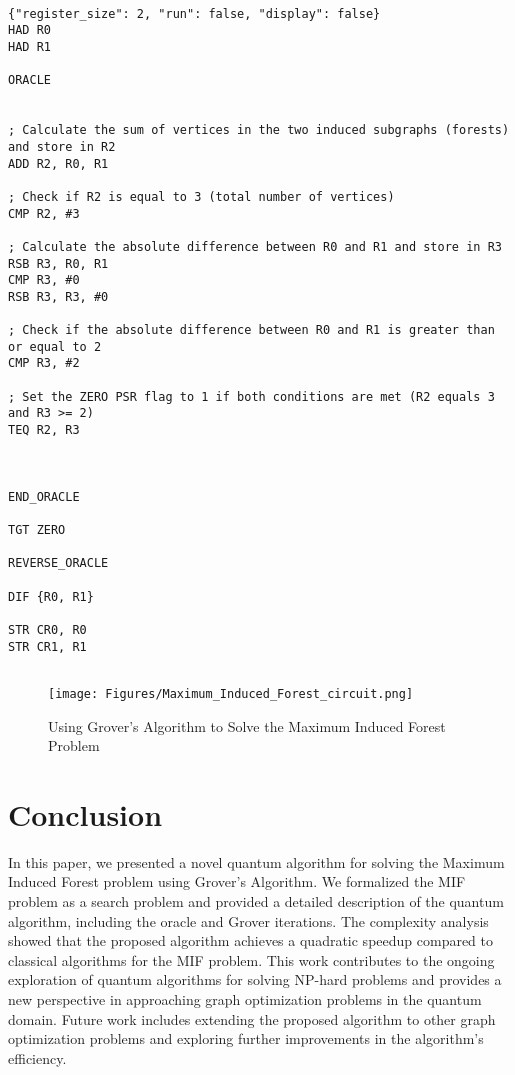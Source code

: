 \begin{lstlisting}

{"register_size": 2, "run": false, "display": false}
HAD R0
HAD R1

ORACLE


; Calculate the sum of vertices in the two induced subgraphs (forests) and store in R2
ADD R2, R0, R1

; Check if R2 is equal to 3 (total number of vertices)
CMP R2, #3

; Calculate the absolute difference between R0 and R1 and store in R3
RSB R3, R0, R1
CMP R3, #0
RSB R3, R3, #0

; Check if the absolute difference between R0 and R1 is greater than or equal to 2
CMP R3, #2

; Set the ZERO PSR flag to 1 if both conditions are met (R2 equals 3 and R3 >= 2)
TEQ R2, R3



END_ORACLE

TGT ZERO

REVERSE_ORACLE

DIF {R0, R1}

STR CR0, R0
STR CR1, R1


\end{lstlisting}

\begin{figure}[htp]
    \centering
    \texttt{[image: Figures/Maximum\_Induced\_Forest\_circuit.png]}
    \caption{Using Grover's Algorithm to Solve the Maximum Induced Forest Problem}
    \label{fig:Maximum_Induced_Forest}
\end{figure}

\section{Conclusion}

In this paper, we presented a novel quantum algorithm for solving the Maximum Induced Forest problem using Grover's Algorithm. We formalized the MIF problem as a search problem and provided a detailed description of the quantum algorithm, including the oracle and Grover iterations. The complexity analysis showed that the proposed algorithm achieves a quadratic speedup compared to classical algorithms for the MIF problem. This work contributes to the ongoing exploration of quantum algorithms for solving NP-hard problems and provides a new perspective in approaching graph optimization problems in the quantum domain. Future work includes extending the proposed algorithm to other graph optimization problems and exploring further improvements in the algorithm's efficiency.

